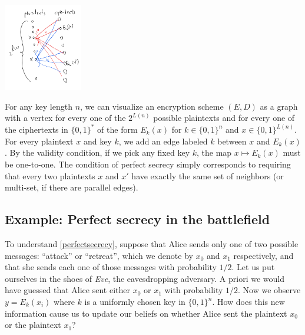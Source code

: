 

\begin{marginfigure}
\centering
\includegraphics[width=\linewidth, height=1.5in, keepaspectratio]{../figure/perfectsecrecy.png}
\caption{For any key length \(n\), we can visualize an encryption scheme
\((E,D)\) as a graph with a vertex for every one of the \(2^{L(n)}\)
possible plaintexts and for every one of the ciphertexts in
\(\{0,1\}^*\) of the form \(E_k(x)\) for \(k\in \{0,1\}^n\) and
\(x\in \{0,1\}^{L(n)}\). For every plaintext \(x\) and key \(k\), we add
an edge labeled \(k\) between \(x\) and \(E_k(x)\). By the validity
condition, if we pick any fixed key \(k\), the map \(x \mapsto E_k(x)\)
must be one-to-one. The condition of perfect secrecy simply corresponds
to requiring that every two plaintexts \(x\) and \(x'\) have exactly the
same set of neighbors (or multi-set, if there are parallel edges).}
\label{perfectsecfig}
\end{marginfigure}

\subsection{Example: Perfect secrecy in the
battlefield}\label{Example-Perfect-secrecy-i}

To understand \cref{perfectsecrecy}, suppose that Alice sends only one
of two possible messages: ``attack'' or ``retreat'', which we denote by
\(x_0\) and \(x_1\) respectively, and that she sends each one of those
messages with probability \(1/2\). Let us put ourselves in the shoes of
\emph{Eve}, the eavesdropping adversary. A priori we would have guessed
that Alice sent either \(x_0\) or \(x_1\) with probability \(1/2\). Now
we observe \(y=E_k(x_i)\) where \(k\) is a uniformly chosen key in
\(\{0,1\}^n\). How does this new information cause us to update our
beliefs on whether Alice sent the plaintext \(x_0\) or the plaintext
\(x_1\)?

